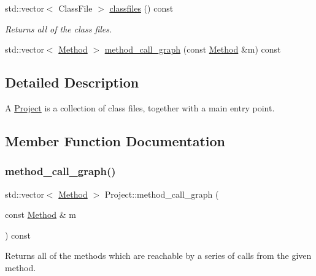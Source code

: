 \begin{DoxyCompactItemize}
\mbox{\label{classProject_a74b0dfe1d19f11e859489922a8d277c7}} 
std\+::vector$<$ Class\+File $>$ \hyperlink{classProject_a74b0dfe1d19f11e859489922a8d277c7}{classfiles} () const
\begin{DoxyCompactList}\small\item\em Returns all of the class files. \end{DoxyCompactList}\item 
std\+::vector$<$ \hyperlink{classMethod}{Method} $>$ \hyperlink{classProject_ac4d866eaedfd1083d4736530382c7b7c}{method\+\_\+call\+\_\+graph} (const \hyperlink{classMethod}{Method} \&m) const
\end{DoxyCompactItemize}


\subsection{Detailed Description}
A \hyperlink{classProject}{Project} is a collection of class files, together with a main entry point. 

\subsection{Member Function Documentation}
\mbox{\label{classProject_ac4d866eaedfd1083d4736530382c7b7c}} 
\subsubsection{\texorpdfstring{method\+\_\+call\+\_\+graph()}{method\_call\_graph()}}
{\footnotesize\ttfamily std\+::vector$<$ \hyperlink{classMethod}{Method} $>$ Project\+::method\+\_\+call\+\_\+graph (\begin{DoxyParamCaption}\item[{const \hyperlink{classMethod}{Method} \&}]{m }\end{DoxyParamCaption}) const}

Returns all of the methods which are reachable by a series of calls from the given method. \mbox{\label{classProject_af5f35c59d1175af1cfa659a597bb6353}} 
